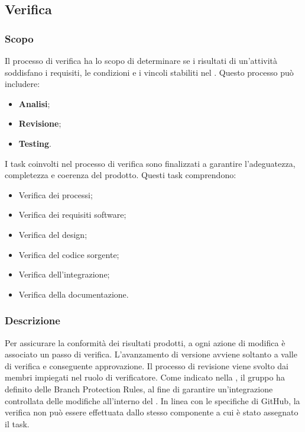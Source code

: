 \subsection{Verifica}\label{verifica}

\subsubsection{Scopo}

\par Il processo di verifica ha lo scopo di determinare se i risultati di un'attività soddisfano i requisiti, le condizioni e i vincoli stabiliti nel \PianoDiQualifica. Questo processo può includere:
\begin{itemize}
  \item \textbf{Analisi};
  \item \textbf{Revisione};
  \item \textbf{Testing}.
\end{itemize}

\vspace{0.5\baselineskip}
\par I task coinvolti nel processo di verifica sono finalizzati a garantire l'adeguatezza, completezza e coerenza del prodotto. Questi task comprendono:
\begin{itemize}
  \item Verifica dei processi;
  \item Verifica dei requisiti software;
  \item Verifica del design;
  \item Verifica del codice sorgente;
  \item Verifica dell'integrazione;
  \item Verifica della documentazione.
\end{itemize}

\subsubsection{Descrizione}

\par Per assicurare la conformità dei risultati prodotti, a ogni azione di modifica è associato un passo di verifica. L’avanzamento di versione avviene soltanto a valle di verifica e conseguente approvazione. Il processo di revisione viene svolto dai membri impiegati nel ruolo di verificatore. Come indicato nella , il gruppo ha definito delle Branch Protection Rules, al fine di garantire un'integrazione controllata delle modifiche all'interno del . In linea con le specifiche di GitHub, la verifica non può essere effettuata dallo stesso componente a cui è stato assegnato il task.


